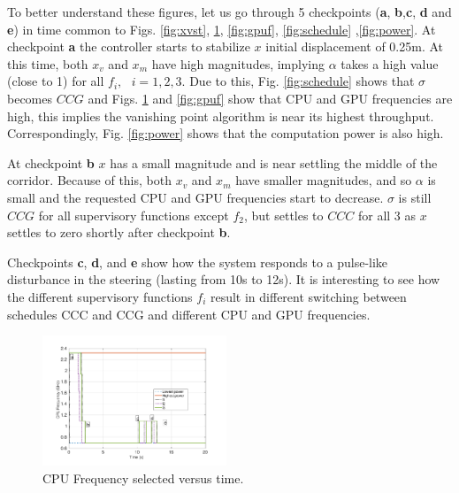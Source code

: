 To better understand these figures, let us go through 5 checkpoints (\textbf{a}, \textbf{b},\textbf{c}, \textbf{d} and \textbf{e}) in time common to Figs. \ref{fig:xvst}, \ref{fig:cpuf}, \ref{fig:gpuf}, \ref{fig:schedule} ,\ref{fig:power}.
At checkpoint \textbf{a} the controller starts to stabilize $x$ initial displacement of 0.25m. 
At this time, both $x_v$ and $x_m$ have high magnitudes, implying $\alpha$ takes a high value (close to 1) for all $f_i,\text{ }i=1,2,3$. 
Due to this, Fig. \ref{fig:schedule} shows that $\sigma$ becomes $CCG$ and Figs. \ref{fig:cpuf} and \ref{fig:gpuf} show that CPU and GPU frequencies are high, this implies the vanishing point algorithm is near its highest throughput. Correspondingly, Fig. \ref{fig:power} shows that the computation power is also high.

At checkpoint \textbf{b} $x$ has a small magnitude and is near settling the middle of the corridor. Because of this, both $x_v$ and $x_m$ have smaller magnitudes, and so $\alpha$ is small and the requested CPU and GPU frequencies start to decrease. $\sigma$ is still $CCG$ for all supervisory functions except $f_2$, but settles to $CCC$ for all 3 as $x$ settles to zero shortly after checkpoint \textbf{b}.

Checkpoints \textbf{c}, \textbf{d}, and \textbf{e} show how the system responds to a pulse-like disturbance in the steering (lasting from 10s to 12s). It is interesting to see how the different supervisory functions $f_i$ result in different switching between schedules CCC and CCG and different CPU and GPU frequencies.

 
\begin{figure}[t]
\centering
\includegraphics[width=0.49\textwidth]{../simulations/figs/CPUF.pdf}
\vspace{-20pt}
\caption{CPU Frequency selected versus time.}
\label{fig:cpuf} 
\end{figure}


